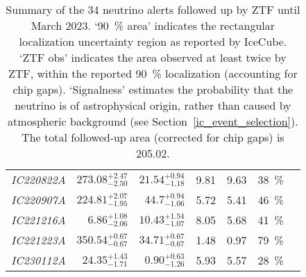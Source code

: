 \begin{table*}
\begin{tabular}{l r r r r c c}
    \emph{IC220822A} & $273.08^{+2.47}_{-2.50}$ & $21.54^{+0.94}_{-1.18}$  & 9.81                 & 9.63                 & \SI{38}{\percent}  & \cite{IC220822A1, IC220822A2}                         \\
    \emph{IC220907A} & $224.81^{+2.07}_{-1.95}$ & $44.7^{+0.94}_{-1.06}$   & 5.72                 & 5.41                 & \SI{46}{\percent}  & \cite{IC220907A1, IC220907A2, IC220907A3}             \\
    \emph{IC221216A} & $6.86^{+1.08}_{-2.06}$   & $10.43^{+1.54}_{-1.07}$  & 8.05                 & 5.68                 & \SI{41}{\percent}  & \cite{IC221216A1, IC221216A2}                         \\
    \emph{IC221223A} & $350.54^{+0.67}_{-0.67}$ & $34.71^{+0.67}_{-0.67}$  & 1.48                 & 0.97                 & \SI{79}{\percent}  & \cite{IC221223A1, IC221223A2}                         \\
    \emph{IC230112A} & $24.35^{+1.43}_{-1.71}$  & $0.90^{+0.63}_{-1.26}$   & 5.93                 & 5.57                 & \SI{28}{\percent}  & \cite{IC230112A1, IC230112A2}                         \\
    \hline
  \end{tabular}
  \caption[Summary of the 34 neutrino alerts followed up by ZTF]{Summary of the 34 neutrino alerts followed up by ZTF until March 2023. `\SI{90}{\percent} area' indicates the rectangular localization uncertainty region as reported by IceCube. `ZTF obs' indicates the area observed at least twice by ZTF, within the reported \SI{90}{\percent} localization (accounting for chip gaps). `Signalness' estimates the probability that the neutrino is of astrophysical origin, rather than caused by atmospheric background (see Section~\ref{ic_event_selection}). The total followed-up area (corrected for chip gaps) is \SI{205.02}{\square\deg}.}
  \label{tab:neutrino_alert_overview}
\end{table*}

